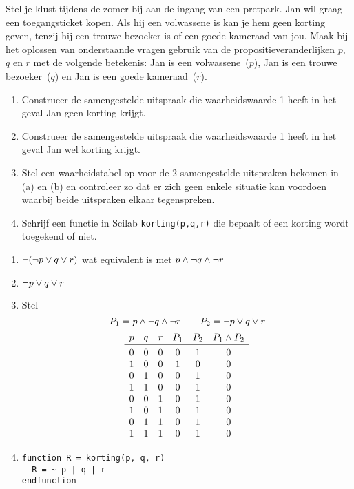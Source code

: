 \begin{oef}
Stel je klust tijdens de zomer bij aan de ingang van een pretpark. Jan wil graag een toegangsticket kopen. Als hij een volwassene is kan je hem geen korting geven, tenzij hij een trouwe bezoeker is of een goede kameraad van jou. Maak bij het oplossen van onderstaande vragen gebruik van de propositieveranderlijken $p$, $q$ en $r$ met de volgende betekenis: Jan is een volwassene~($p$), Jan is een trouwe bezoeker~($q$) en Jan is een goede kameraad~($r$).
\begin{enumerate}
  \item Construeer de samengestelde uitspraak die waarheidswaarde 1 heeft in het geval Jan geen korting krijgt.
  \item Construeer de samengestelde uitspraak die waarheidswaarde 1 heeft in het geval Jan wel korting krijgt.
  \item Stel een waarheidstabel op voor de 2 samengestelde uitspraken bekomen in (a) en (b) en controleer zo dat er zich geen enkele situatie kan voordoen waarbij beide uitspraken elkaar tegenspreken.
  \item Schrijf een functie in Scilab \verb+korting(p,q,r)+ die bepaalt of een korting wordt toegekend of niet.
\end{enumerate}
\begin{opl}
\begin{enumerate}
  \item $\neg(\neg p \vee q \vee r)$ wat equivalent is met $p \wedge \neg q \wedge \neg r$
  \item $\neg p \vee q \vee r$
  \item Stel
        \[ P_1 = p \wedge \neg q \wedge \neg r \qquad P_2 = \neg p \vee q \vee r \]
        \[
          \begin{array}{cccccccc}
            p & q & r & P_1 & P_2 & P_1 \en P_2 \\
            \toprule
            0 & 0 & 0 & 0 & 1 & 0 \\
            1 & 0 & 0 & 1 & 0 & 0 \\
            0 & 1 & 0 & 0 & 1 & 0 \\
            1 & 1 & 0 & 0 & 1 & 0 \\
            0 & 0 & 1 & 0 & 1 & 0 \\
            1 & 0 & 1 & 0 & 1 & 0 \\
            0 & 1 & 1 & 0 & 1 & 0 \\
            1 & 1 & 1 & 0 & 1 & 0 \\            
          \end{array}
        \]
  \item \begin{lstlisting}
function R = korting(p, q, r)
  R = ~ p | q | r
endfunction
        \end{lstlisting}
\end{enumerate}
\end{opl}
\end{oef}

